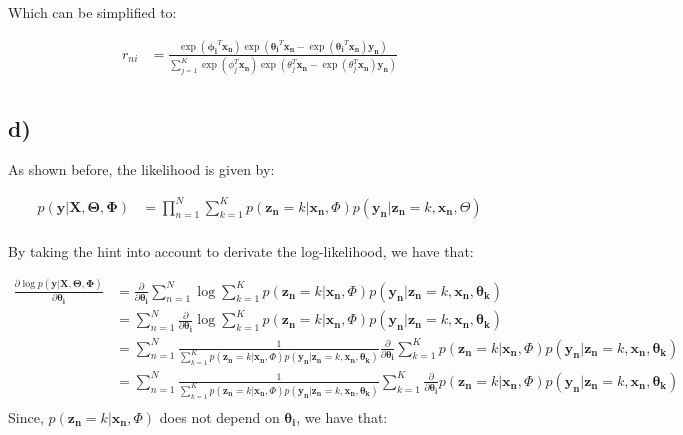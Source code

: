 \documentclass[12pt,a4paper,oneside]{paper}
\begin{document}
Which can be simplified to:

\begin{align*}
    r_{ni} &= \frac{\exp(\bm{\phi_i}^T \bm{x_n}) \exp(\bm{\theta_i}^T \bm{x_n} -\exp(\bm{\theta_i}^T \bm{x_n}) \bm{y_n})}{\sum_{j=1}^{K} \exp(\phi_j^T \bm{x_n}) \exp(\theta_j^T \bm{x_n} -\exp(\theta_j^T \bm{x_n}) \bm{y_n})} \\
\end{align*}

\subsection*{d)}

As shown before, the likelihood is given by:

\begin{align*}
    p(\bm{y} | \bm{X}, \bm{\Theta}, \bm{\Phi}) &= \prod_{n=1}^{N} \sum_{k=1}^{K} p(\bm{z_n} = k | \bm{x_n}, \Phi) p(\bm{y_n} | \bm{z_n} = k, \bm{x_n}, \Theta) \\
\end{align*}

By taking the hint into account to derivate the log-likelihood, we have that:

\begin{align*}
    \frac{\partial \log p(\bm{y} | \bm{X}, \bm{\Theta}, \bm{\Phi})}{\partial \bm{\theta_i}} &= \frac{\partial}{\partial \bm{\theta_i}} \sum_{n=1}^{N} \log \sum_{k=1}^{K} p(\bm{z_n} = k | \bm{x_n}, \Phi) p(\bm{y_n} | \bm{z_n} = k, \bm{x_n}, \bm{\theta_k}) \\
    &= \sum_{n=1}^{N} \frac{\partial}{\partial \bm{\theta_i}} \log \sum_{k=1}^{K} p(\bm{z_n} = k | \bm{x_n}, \Phi) p(\bm{y_n} | \bm{z_n} = k, \bm{x_n}, \bm{\theta_k}) \\
    &= \sum_{n=1}^{N} \frac{1}{\sum_{k=1}^{K} p(\bm{z_n} = k | \bm{x_n}, \Phi) p(\bm{y_n} | \bm{z_n} = k, \bm{x_n}, \bm{\theta_k})} \frac{\partial}{\partial \bm{\theta_i}} \sum_{k=1}^{K} p(\bm{z_n} = k | \bm{x_n}, \Phi) p(\bm{y_n} | \bm{z_n} = k, \bm{x_n}, \bm{\theta_k}) \\
    &= \sum_{n=1}^{N} \frac{1}{\sum_{k=1}^{K} p(\bm{z_n} = k | \bm{x_n}, \Phi) p(\bm{y_n} | \bm{z_n} = k, \bm{x_n}, \bm{\theta_k})} \sum_{k=1}^{K} \frac{\partial}{\partial \bm{\theta_i}} p(\bm{z_n} = k | \bm{x_n}, \Phi) p(\bm{y_n} | \bm{z_n} = k, \bm{x_n}, \bm{\theta_k}) \\
\end{align*}
Since, $p(\bm{z_n} = k | \bm{x_n}, \Phi)$ does not depend on $\bm{\theta_i}$, we have that:
\end{document}
